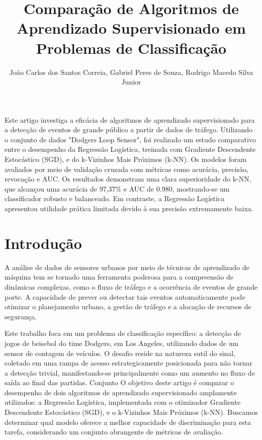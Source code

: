 \documentclass[12pt]{article}
\title{Comparação de Algoritmos de Aprendizado Supervisionado em Problemas de Classificação}
\author{João Carlos dos Santos Correia, Gabriel Peres de Souza, Rodrigo Macedo Silva Junior}
\begin{document}
\maketitle

\begin{resumo}
Este artigo investiga a eficácia de algoritmos de aprendizado supervisionado para a detecção de eventos de grande público a partir de dados de tráfego. Utilizando o conjunto de dados "Dodgers Loop Sensor", foi realizado um estudo comparativo entre o desempenho da Regressão Logística, treinada com Gradiente Descendente Estocástico (SGD), e do k-Vizinhos Mais Próximos (k-NN). Os modelos foram avaliados por meio de validação cruzada com métricas como acurácia, precisão, revocação e AUC. Os resultados demonstram uma clara superioridade do k-NN, que alcançou uma acurácia de 97,37\% e AUC de 0.980, mostrando-se um classificador robusto e balanceado. Em contraste, a Regressão Logística apresentou utilidade prática limitada devido à sua precisão extremamente baixa.
\end{resumo}

\section{Introdução}
A análise de dados de sensores urbanos por meio de técnicas de aprendizado de máquina tem se tornado uma ferramenta poderosa para a compreensão de dinâmicas complexas, como o fluxo de tráfego e a ocorrência de eventos de grande porte. A capacidade de prever ou detectar tais eventos automaticamente pode otimizar o planejamento urbano, a gestão de tráfego e a alocação de recursos de segurança.

Este trabalho foca em um problema de classificação específico: a detecção de jogos de beisebol do time Dodgers, em Los Angeles, utilizando dados de um sensor de contagem de veículos. O desafio reside na natureza sutil do sinal, coletado em uma rampa de acesso estrategicamente posicionada para não tornar a detecção trivial, manifestando-se principalmente como um aumento no fluxo de saída ao final das partidas.
Conjunto
O objetivo deste artigo é comparar o desempenho de dois algoritmos de aprendizado supervisionado amplamente utilizados: a Regressão Logística, implementada com o otimizador Gradiente Descendente Estocástico (SGD), e o k-Vizinhos Mais Próximos (k-NN). Buscamos determinar qual modelo oferece a melhor capacidade de discriminação para esta tarefa, considerando um conjunto abrangente de métricas de avaliação.
\end{document}
